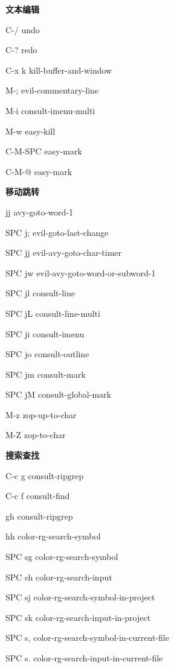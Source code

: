 \documentclass[10pt]{article}
\renewcommand\subsection[1]{\smallskip\par\textbf{\color{heading}#1}}
\begin{document}
\begin{CJK}{UTF8}{gbsn}
\begin{multicols}{3}
  \subsection{文本编辑}
  \begin{keylist}
  \item[C-/] undo
  \item[C-?] redo
  \item[C-x k] kill-buffer-and-window
  \item[M-;] evil-commentary-line
  \item[M-i] consult-imenu-multi
  \item[M-w] easy-kill
  \item[C-M-SPC] easy-mark
  \item[C-M-@] easy-mark
  \end{keylist}

  \subsection{移动跳转}
  \begin{keylist}
  \item[jj] avy-goto-word-1
  \item[SPC j;] evil-goto-last-change
  \item[SPC jj] evil-avy-goto-char-timer
  \item[SPC jw] evil-avy-goto-word-or-subword-1
  \item[SPC jl] consult-line
  \item[SPC jL] consult-line-multi
  \item[SPC ji] consult-imenu
  \item[SPC jo] consult-outline
  \item[SPC jm] consult-mark
  \item[SPC jM] consult-global-mark
  \item[M-z] zop-up-to-char
  \item[M-Z] zop-to-char
  \end{keylist}

  \subsection{搜索查找}
  \begin{keylist}
  \item[C-c g] consult-ripgrep
  \item[C-c f] consult-find
  \item[gh] consult-ripgrep
  \item[hh] color-rg-search-symbol
  \item[SPC sg] color-rg-search-symbol
  \item[SPC sh] color-rg-search-input
  \item[SPC sj] color-rg-search-symbol-in-project
  \item[SPC sk] color-rg-search-input-in-project
  \item[SPC s,] color-rg-search-symbol-in-current-file
  \item[SPC s.] color-rg-search-input-in-current-file
  \end{keylist}


\end{multicols}
\end{CJK}
\end{document}
